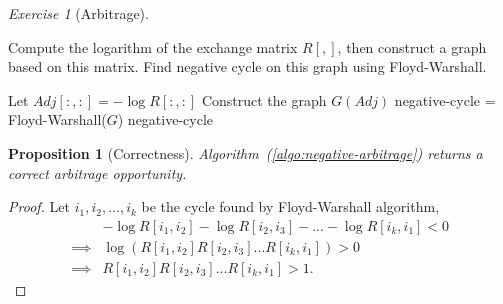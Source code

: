 \documentclass[a4paper,10pt,twoside]{article}
\theoremstyle{plain}
\newtheorem{proposition}{Proposition}
\theoremstyle{definition}
\theoremstyle{remark}
\theoremstyle{exercise}
\newtheorem{exercise}{Exercise}
\begin{document}
\begin{exercise}[Arbitrage]\

Compute the logarithm of the exchange matrix $R[,]$, then construct
a graph based on this matrix. Find negative cycle on this graph 
using Floyd-Warshall.

\begin{algorithm}[H]
\caption{Arbitrage Opportunity($R[:, :]$)}
\label{algo:negative-arbitrage}
	Let $Adj[:, :] = -\log R[:,:]$ 
	Construct the graph $G(Adj)$\;
	negative-cycle = Floyd-Warshall($G$)\;
	\Return negative-cycle
\end{algorithm}

\begin{proposition}[Correctness]
Algorithm~(\ref{algo:negative-arbitrage}) returns a correct arbitrage
opportunity.
\end{proposition}

\begin{proof}
Let $i_1, i_2, ..., i_k$ be the cycle found by Floyd-Warshall algorithm,
\[
\begin{aligned}
&- \log R[i_1, i_2] - \log R[i_2, i_3] - ... - \log R[i_k, i_1] < 0 \\
\implies&\log (R[i_1, i_2]R[i_2, i_3]...R[i_k, i_1]) > 0\\
\implies&R[i_1, i_2]R[i_2, i_3]...R[i_k, i_1] > 1.
\end{aligned}
\]
\end{proof}
\end{exercise}	
\end{document}
